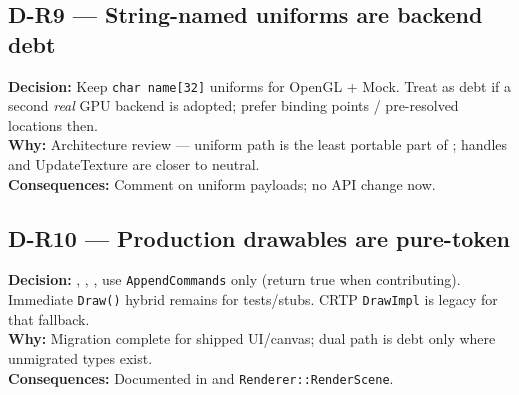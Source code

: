 \subsection*{D-R9 --- String-named uniforms are backend debt}
\begin{decisionbox}[title={D-R9 \quad 2026-07-28}]
\textbf{Decision:} Keep \texttt{char name[32]} uniforms for OpenGL + Mock.
Treat as debt if a second \emph{real} GPU backend is adopted; prefer binding
points / pre-resolved locations then.\\
\textbf{Why:} Architecture review --- uniform path is the least portable part
of ; handles and UpdateTexture are closer to neutral.\\
\textbf{Consequences:} Comment on uniform payloads; no API change now.
\end{decisionbox}

\subsection*{D-R10 --- Production drawables are pure-token}
\begin{decisionbox}[title={D-R10 \quad 2026-07-28}]
\textbf{Decision:} , ,
,  use
\texttt{AppendCommands} only (return true when contributing). Immediate
\texttt{Draw()} hybrid remains for tests/stubs. CRTP \texttt{DrawImpl} is
legacy for that fallback.\\
\textbf{Why:} Migration complete for shipped UI/canvas; dual path is debt only
where unmigrated types exist.\\
\textbf{Consequences:} Documented in  and
\texttt{Renderer::RenderScene}.
\end{decisionbox}

